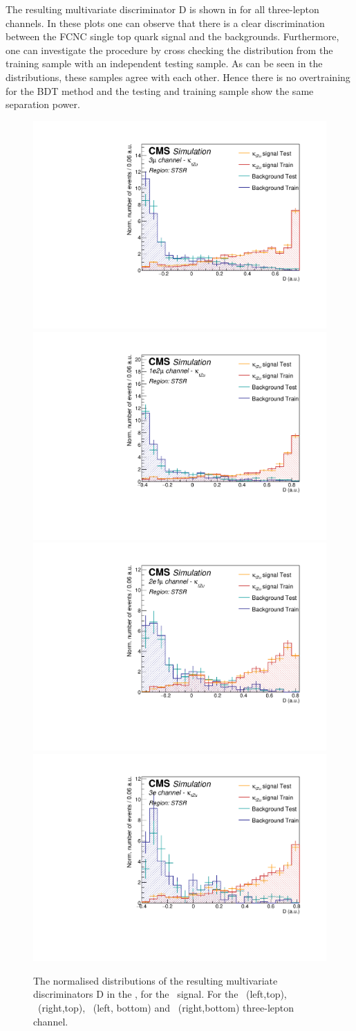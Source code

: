 \clearpage

The resulting multivariate discriminator D is shown in  for all three-lepton channels. In these plots one can observe that there is a clear discrimination between the FCNC single top quark signal and the backgrounds. Furthermore, one can investigate the procedure by cross checking the distribution from the training sample with an independent testing sample. As can be seen in the distributions, these samples agree with each other. Hence there is no overtraining for the BDT method and the testing and training sample show the same separation power. 
\begin{figure}[htbp]
	\centering
	\includegraphics[width=0.49\linewidth]{6_Search/Figures/PlotsTechnics/SigVsBkgTestZutsingletopuuu}
	\includegraphics[width=0.49\linewidth]{6_Search/Figures/PlotsTechnics/SigVsBkgTestZutsingletopuue}
	\includegraphics[width=0.49\linewidth]{6_Search/Figures/PlotsTechnics/SigVsBkgTestZutsingletopeeu}
	\includegraphics[width=0.49\linewidth]{6_Search/Figures/PlotsTechnics/SigVsBkgTestZutsingletopeee}
\caption{The normalised distributions of the resulting  multivariate discriminators D in the \STSR, for the \Zut\ signal. For the \mumumu\ (left,top), \emumu\ (right,top), \eemu\ (left, bottom) and \eee\ (right,bottom) three-lepton channel.}
	\label{fig:sigvsbkgtestzutsingletop}
\end{figure}

